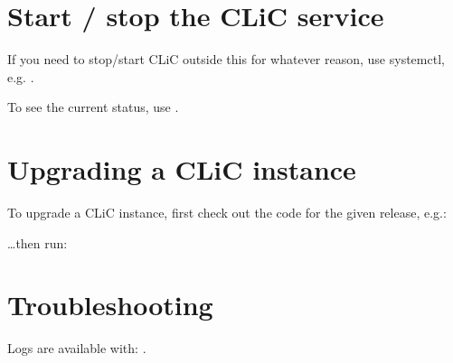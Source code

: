 \documentclass[letterpaper,10pt,english]{sphinxmanual}
\begin{document}
\begin{sphinxVerbatim}[commandchars=\\\{\}]
 
\end{sphinxVerbatim}


\section{Start / stop the CLiC service}
\label{\detokenize{advanced/production:start-stop-the-clic-service}}
\sphinxAtStartPar
If you need to stop/start CLiC outside this for whatever reason, use systemctl,
e.g. .

\sphinxAtStartPar
To see the current status, use .


\section{Upgrading a CLiC instance}
\label{\detokenize{advanced/production:upgrading-a-clic-instance}}
\sphinxAtStartPar
To upgrade a CLiC instance, first check out the code for the given release, e.g.:

\begin{sphinxVerbatim}[commandchars=\\\{\}]
     
\end{sphinxVerbatim}

\sphinxAtStartPar
…then run:

\begin{sphinxVerbatim}[commandchars=\\\{\}]
 
\end{sphinxVerbatim}


\section{Troubleshooting}
\label{\detokenize{advanced/production:troubleshooting}}
\sphinxAtStartPar
Logs are available with: .
\end{document}
